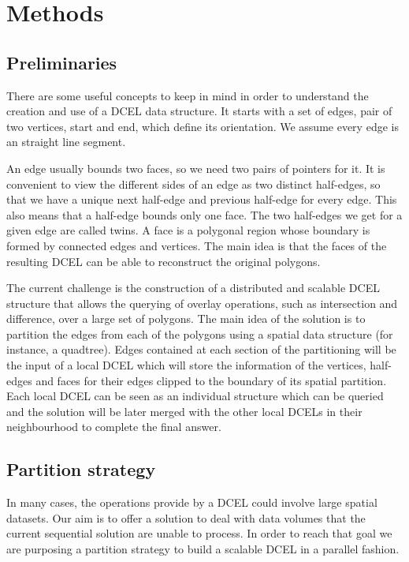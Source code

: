 \section{Methods} \label{sec:methods}

\subsection{Preliminaries}
There are some useful concepts to keep in mind in order to understand the creation and use of a DCEL data structure.  It starts with a set of edges, pair of two vertices, start and end, which define its orientation. We assume every edge is an straight line segment.

An edge usually bounds two faces, so we need two pairs of pointers for it. It is convenient to view the different sides of an edge as two distinct half-edges, so that we have a unique next half-edge and previous half-edge for every edge. This also means that a half-edge bounds only one face. The two half-edges we get for a given edge are called twins.  A face is a polygonal region whose boundary is formed by connected edges and vertices.  The main idea is that the faces of the resulting DCEL can be able to reconstruct the original polygons.

The current challenge is the construction of a distributed and scalable DCEL structure that allows the querying of overlay operations, such as intersection and difference, over a large set of polygons.  The main idea of the solution is to partition the edges from each of the polygons using a spatial data structure (for instance, a quadtree).  Edges contained at each section of the partitioning will be the input of a local DCEL which will store the information of the vertices, half-edges and faces for their edges clipped to the boundary of its spatial partition.  Each local DCEL can be seen as an individual structure which can be queried and the solution will be later merged with the other local DCELs in their neighbourhood to complete the final answer. 

\subsection{Partition strategy} \label{sec:strategy}
In many cases, the operations provide by a DCEL could involve large spatial datasets.  Our aim is to offer a solution to deal with data volumes that the current sequential solution are unable to process.  In order to reach that goal we are purposing a partition strategy to build a scalable DCEL in a parallel fashion.  

